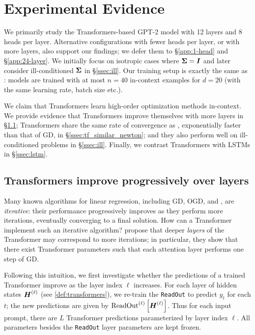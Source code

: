 \vspace{-1mm}
\section{Experimental Evidence} \label{sec:experiments}
\vspace{-1mm}



We primarily study the Transformers-based GPT-2 model with 12 layers and 8 heads per layer. Alternative configurations with fewer heads per layer, or with more layers, also support our findings; we defer them to \S \ref{app:1-head} and \S\ref{app:24-layer}. We initially focus on isotropic cases where $\boldsymbol{\Sigma} = \boldsymbol{I}$ and later consider ill-conditioned $\boldsymbol{\Sigma}$ in \S \ref{ssec:ill}. Our training setup is exactly the same as \citet{Garg2022WhatCT}: models are trained with at most $n = 40$ in-context examples for $d = 20$ (with the same learning rate, batch size etc.).  

We claim that Transformers learn high-order optimization methods in-context. We provide evidence that Transformers improve themselves with more layers in \S \ref{ssec:progress}; Transformers share the same rate of convergence as \newton, exponentially faster than that of GD, in \S \ref{ssec:tf_similar_newton}; and they also  perform well on ill-conditioned problems in \S \ref{ssec:ill}. Finally, we contrast  Transformers with LSTMs in \S \ref{ssec:lstm}.


\vspace{-1mm}
\subsection{Transformers improve progressively over layers} \label{ssec:progress}
\vspace{-1mm}

Many known algorithms for linear regression, including GD, OGD, and \newton, are \emph{iterative}:
their performance progressively improves as they perform more iterations, eventually converging to a final solution.
How can a Transformer implement such an iterative algorithm?
\citet{Oswald2022TransformersLI} propose that deeper \emph{layers} of the Transformer may correspond to more iterations;
in particular, they show that there exist Transformer parameters such that each attention layer performs one step of GD.

Following this intuition, we first investigate whether the predictions of a trained Transformer improve as the layer index $\ell$ increases. 
For each layer of hidden states $\boldsymbol{H}^{(\ell)}$ (see \cref{def:transformers}), we re-train the \verb|ReadOut| to predict $y_t$ for each $t$; the new predictions are given by $\mathrm{ReadOut}^{(\ell)}\left[\boldsymbol{H}^{(\ell)}\right]$. Thus for each input prompt, there are $L$ Transformer predictions parameterized by layer index $\ell$.
All parameters besides the \verb|ReadOut| layer parameters are kept frozen.

